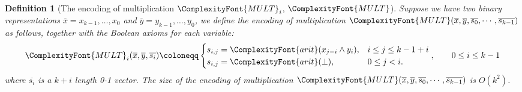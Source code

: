 \documentclass[11pt,letter]{article}
\newtheorem{definition}[theorem]{Definition}
\theoremstyle{remark} %
\newcommand{\arit}{ %
    {
        \ComplexityFont{arit}
    }
}
\newcommand{\mult}{ %
    {
        \ComplexityFont{MULT}
    }
}
\begin{document}
{    \begin{definition}[The encoding of multiplication $\mult_i$, $\mult$] 
        \label{def: prod, mult}
        Suppose we have two binary representations $\overline{x}=x_{k-1},\dots,x_0$ and $\overline{y}=y_{k-1},\dots,y_0$, we define the encoding of multiplication $\mult(\overline{x},\overline{y},\overline{s_0},\cdots, \overline{s_{k-1}})$ as follows, together with the Boolean axioms for each variable:
        \begin{equation*}
            \mult_i(\overline{x},\overline{y},\overline{s_i}) \coloneqq \begin{cases}
                s_{i,j} = \arit(x_{j-i} \land y_i), &  i \leq j \leq k-1+i\\
                s_{i,j} = \arit(\bot), & 0 \leq j < i.
            \end{cases},\qquad  0 \leq i \leq k-1
        \end{equation*}
        where $\overline{s_i}$ is a $k+i$ length 0-1 vector.
        The size of the encoding of multiplication $\mult(\overline{x},\overline{y},\overline{s_0},\cdots, \overline{s_{k-1}})$ is $O(k^2)$.
    \end{definition}

}
\end{document}
